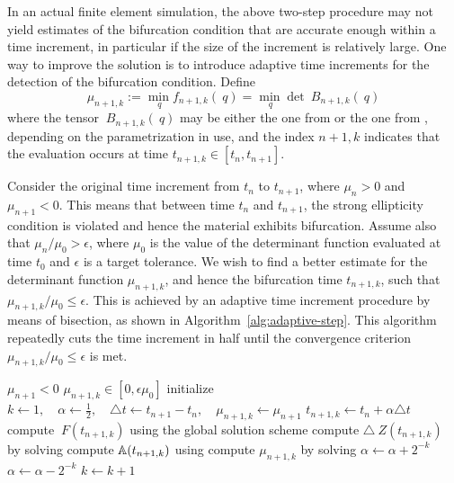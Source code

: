\documentclass[12pt]{article}
\numberwithin{equation}{section}
\begin{document}
In an actual finite element simulation, the above two-step procedure
may not yield estimates of the bifurcation condition that are accurate
enough within a time increment, in particular if the size of the
increment is relatively large. One way to improve the solution is to
introduce adaptive time increments for the detection of the
bifurcation condition.  Define
\begin{equation} \label{eq:general-minimization-problem}
  \mu_{n+1,k} := \min_{~q} f_{n+1,k}(~q) = \min_{~q} \det ~B_{n+1,k}(~q)
\end{equation}
where the tensor $~B_{n+1,k}(~q)$ may be either the one from
 or the one from
, depending on the parametrization
in use, and the index ${n+1,k}$ indicates that the evaluation occurs
at time $t_{n+1,k} \in [t_n, t_{n+1}]$.

Consider the original time increment from $t_n$ to $t_{n+1}$, where
$\mu_n > 0$ and $\mu_{n+1} < 0$. This means that between time $t_n$
and $t_{n+1}$, the strong ellipticity condition is violated and hence
the material exhibits bifurcation. Assume also that $\mu_n / \mu_0 >
\epsilon$, where $\mu_0$ is the value of the determinant function
evaluated at time $t_0$ and $\epsilon$ is a target tolerance. We wish
to find a better estimate for the determinant function $\mu_{n+1,k}$,
and hence the bifurcation time $t_{n+1,k}$, such that $\mu_{n+1,k} /
\mu_0 \le \epsilon$. This is achieved by an adaptive time increment
procedure by means of bisection, as shown in
Algorithm~\ref{alg:adaptive-step}. This algorithm repeatedly cuts the
time increment in half until the convergence criterion $\mu_{n+1,k} /
\mu_0 \le \epsilon$ is met.

\begin{algorithm}[htbp]
  \caption{$\text{AdaptiveStep}(\mu_0, \mu_{n+1}, t_{n+1}, \epsilon)$}
  \begin{algorithmic}
    \REQUIRE $\mu_{n+1} < 0$
    \ENSURE $\mu_{n+1,k} \in [0, \epsilon \mu_0]$
    \STATE initialize
    $k \leftarrow 1,
    \quad
    \alpha \leftarrow \frac{1}{2},
    \quad
    \triangle t \leftarrow t_{n+1} - t_n,
    \quad
    \mu_{n+1,k} \leftarrow \mu_{n+1}$
    \STATE $t_{n+1,k} \leftarrow t_n + \alpha \triangle t$
    \STATE compute $~F(t_{n+1,k})$ using the global solution scheme
    \STATE compute $\triangle ~Z(t_{n+1,k})$
    by solving 
    \STATE compute $\mathbb{A}(t_{n+1,k})$
    using 
    \STATE compute $\mu_{n+1,k}$
    by solving 
    \STATE $\alpha \leftarrow \alpha + 2^{-k}$
    \ELSE
    \STATE $\alpha \leftarrow \alpha - 2^{-k}$
    \ENDIF
    \STATE $k \leftarrow k+1$
    \ENDWHILE
  \end{algorithmic}
  \label{alg:adaptive-step}
\end{algorithm}
\end{document}
